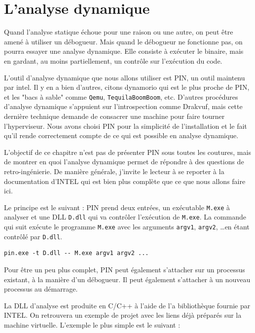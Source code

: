 \documentclass{book}
\begin{document}
\chapter{L'analyse dynamique}

Quand l'analyse statique échoue pour une raison ou une autre, on peut être amené à utiliser un débogueur. Mais quand le débogueur ne fonctionne pas, on pourra essayer une analyse dynamique. Elle consiste à exécuter le binaire, mais en gardant, au moins partiellement, un contrôle sur l'exécution du code.


L'outil d'analyse dynamique que nous allons utiliser est  {\sc PIN}, un outil maintenu par {\sc intel}. Il y en a bien d'autres, citons {\sc dynamorio} qui est le plus proche de {\sc PIN}, et les "bacs à sable" comme {\tt Qemu}, {\tt TequilaBoomBoom}, etc. D'autres procédures d'analyse dynamique s'appuient sur l'introspection comme {\sc Drakvuf}, mais cette dernière technique demande de consacrer une machine pour faire tourner l'hyperviseur. Nous avons choisi {\sc PIN} pour la simplicité de l'installation et le fait qu'il rende correctement compte de ce qui est possible en analyse dynamique. 

L'objectif de ce chapitre n'est pas de présenter {\sc PIN} sous toutes les coutures, mais de montrer en quoi l'analyse dynamique permet de répondre à des questions de retro-ingénierie. De manière générale, j'invite le lecteur à se reporter à la documentation d'{\sc INTEL} qui est bien plus complète que ce que nous allons faire ici. 

Le principe  est le suivant : {\sc PIN} prend deux entrées, un exécutable {\tt M.exe} à analyser et une DLL {\tt D.dll} qui va contrôler l'exécution de {\tt M.exe}.  La commande qui suit exécute le programme {\tt M.exe} avec les arguments {\tt argv1}, {\tt argv2}, \ldots en étant contrôlé par {\tt D.dll}. 

\begin{verbatim}
pin.exe -t D.dll -- M.exe argv1 argv2 ...
\end{verbatim}

Pour être un peu plus complet, {\sc PIN}  peut également s'attacher sur un processus existant, à la manière d'un débogueur. Il peut également s'attacher à un nouveau processus au démarrage. 

La DLL d'analyse est produite en C/C++ à l'aide de l'a bibliothèque fournie par {\sc INTEL}. On retrouvera un exemple de projet avec les liens déjà préparés sur la machine virtuelle.  L'exemple le plus simple est le suivant : 
\end{document}
